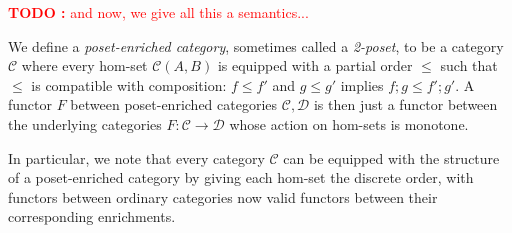 \documentclass[acmsmall,screen,review]{acmart}
\newcounter{todos}
\newcommand{\TODO}[1]{{
  \stepcounter{todos}
  \begin{center}\large{\textcolor{red}{\textbf{TODO \arabic{todos}:} #1}}\end{center}
}}
\newcommand{\mc}[1]{\ensuremath{\mathcal{#1}}}
\begin{document}
\TODO{and now, we give all this a semantics...}

\begin{definition}
  We define a \emph{poset-enriched category}, sometimes called a \emph{2-poset}, to be a category
  $\mc{C}$ where every hom-set $\mc{C}(A, B)$ is equipped with a partial order $\leq$ such that
  $\leq$ is compatible with composition: $f \leq f'$ and $g \leq g'$ implies $f;g \leq f';g'$. A
  functor $F$ between poset-enriched categories $\mc{C}, \mc{D}$ is then just a functor between the
  underlying categories $F : \mc{C} \to \mc{D}$ whose action on hom-sets is monotone.

  In particular, we note that every category $\mc{C}$ can be equipped with the structure of a
  poset-enriched category by giving each hom-set the discrete order, with functors between ordinary
  categories now valid functors between their corresponding enrichments.
\end{definition}
\end{document}
